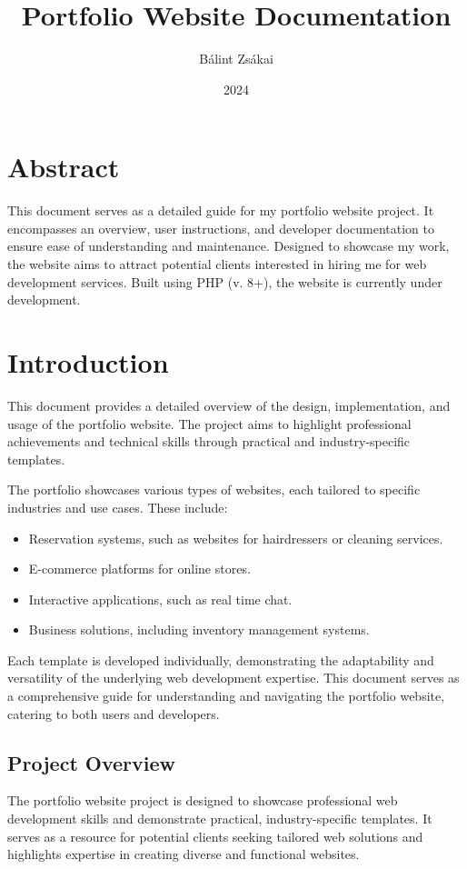 \documentclass[12pt,a4paper]{report}
\title{Portfolio Website Documentation}
\author{Bálint Zsákai}
\date{2024}
\begin{document}
\maketitle
{}

\chapter*{Abstract}
This document serves as a detailed guide for my portfolio website project. It encompasses an overview, user instructions, and developer documentation to ensure ease of understanding and maintenance. Designed to showcase my work, the website aims to attract potential clients interested in hiring me for web development services. Built using PHP (v. 8+), the website is currently under development.

\newpage
\tableofcontents
\newpage


\chapter{Introduction}
This document provides a detailed overview of the design, implementation, and usage of the portfolio website. The project aims to highlight professional achievements and technical skills through practical and industry-specific templates.

The portfolio showcases various types of websites, each tailored to specific industries and use cases. These include:

\begin{itemize}
    \item Reservation systems, such as websites for hairdressers or cleaning services.
    \item E-commerce platforms for online stores.
    \item Interactive applications, such as real time chat.
    \item Business solutions, including inventory management systems.
\end{itemize}

Each template is developed individually, demonstrating the adaptability and versatility of the underlying web development expertise. This document serves as a comprehensive guide for understanding and navigating the portfolio website, catering to both users and developers.

\section{Project Overview}
The portfolio website project is designed to showcase professional web development skills and demonstrate practical, industry-specific templates. It serves as a resource for potential clients seeking tailored web solutions and highlights expertise in creating diverse and functional websites.
\end{document}
